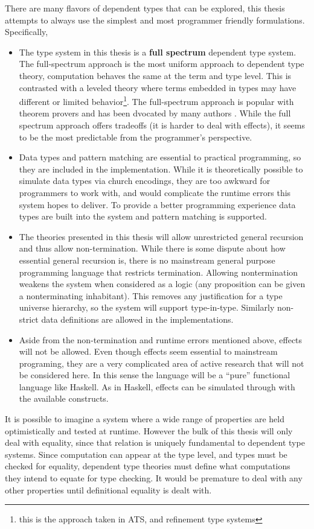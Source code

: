 There are many flavors of dependent types that can be explored, this thesis attempts to always use the simplest and most programmer friendly formulations.
Specifically,
\begin{itemize}
\item The type system in this thesis is a \textbf{full spectrum} dependent type system.
The full-spectrum approach is the most uniform approach to dependent type theory, computation behaves the same at the term and type level.
This is contrasted with a leveled theory where terms embedded in types may have different or limited behavior\footnote{this is the approach taken in ATS, and refinement type systems}.
The full-spectrum approach is popular with theorem provers and has been dvocated by many authors \cite{10.1145/289423.289451,norell2007towards,brady2013idris,sjoberg2012irrelevance}.
While the full spectrum approach offers tradeoffs (it is harder to deal with effects), it seems to be the most predictable from the programmer's perspective.
\item Data types and pattern matching are essential to practical programming, so they are included in the implementation.
While it is theoretically possible to simulate data types via church encodings, they are too awkward for programmers to work with, and would complicate the runtime errors this system hopes to deliver.
To provide a better programming experience data types are built into the system and pattern matching is supported.
\item The theories presented in this thesis will allow unrestricted general recursion and thus allow non-termination.
While there is some dispute about how essential general recursion is,
there is no mainstream general purpose programming language that restricts termination.
Allowing nontermination weakens the system when considered as a logic (any proposition can be given a nonterminating inhabitant).
This removes any justification for a type universe hierarchy, so the system will support type-in-type.
Similarly non-strict data definitions are allowed in the implementations.
\item Aside from the non-termination and runtime errors mentioned above, effects will not be allowed.
Even though effects seem essential to mainstream programing, they are a very complicated area of active research that will not be considered here.
In this sense the language will be a ``pure'' functional language like Haskell.
As in Haskell, effects can be simulated through with the available constructs.
\end{itemize}
It is possible to imagine a system where a wide range of properties are held optimistically and tested at runtime.
However the bulk of this thesis will only deal with equality, since that relation is uniquely fundamental to dependent type systems.
Since computation can appear at the type level, and types must be checked for equality, dependent type theories must define what computations they intend to equate for type checking.
It would be premature to deal with any other properties until definitional equality is dealt with.

